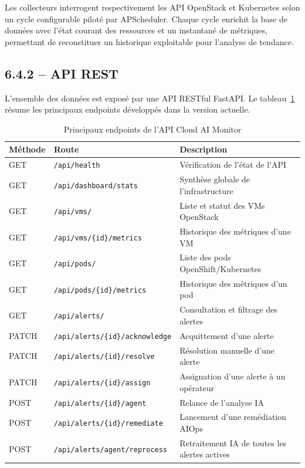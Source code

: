 \documentclass[11pt,a4paper]{report}
\begin{document}
Les collecteurs interrogent respectivement les API OpenStack et Kubernetes
selon un cycle configurable piloté par APScheduler. Chaque cycle enrichit la
base de données avec l'état courant des ressources et un instantané de
métriques, permettant de reconstituer un historique exploitable pour
l'analyse de tendance.

\subsection*{6.4.2 -- API REST}

L'ensemble des données est exposé par une API RESTful FastAPI. Le
tableau~\ref{tab:api} résume les principaux endpoints développés dans la
version actuelle.

\begin{table}[H]
\centering
\caption{Principaux endpoints de l'API Cloud AI Monitor}
\label{tab:api}
\begin{tabular}{|l|l|p{6cm}|}
\hline
\textbf{Méthode} & \textbf{Route} & \textbf{Description} \\
\hline
GET  & \texttt{/api/health}                  & Vérification de l'état de l'API \\
GET  & \texttt{/api/dashboard/stats}         & Synthèse globale de l'infrastructure \\
GET  & \texttt{/api/vms/}                    & Liste et statut des VMs OpenStack \\
GET  & \texttt{/api/vms/\{id\}/metrics}      & Historique des métriques d'une VM \\
GET  & \texttt{/api/pods/}                   & Liste des pods OpenShift/Kubernetes \\
GET  & \texttt{/api/pods/\{id\}/metrics}     & Historique des métriques d'un pod \\
GET  & \texttt{/api/alerts/}                 & Consultation et filtrage des alertes \\
PATCH & \texttt{/api/alerts/\{id\}/acknowledge} & Acquittement d'une alerte \\
PATCH & \texttt{/api/alerts/\{id\}/resolve} & Résolution manuelle d'une alerte \\
PATCH & \texttt{/api/alerts/\{id\}/assign}  & Assignation d'une alerte à un opérateur \\
POST & \texttt{/api/alerts/\{id\}/agent}    & Relance de l'analyse IA \\
POST & \texttt{/api/alerts/\{id\}/remediate} & Lancement d'une remédiation AIOps \\
POST & \texttt{/api/alerts/agent/reprocess} & Retraitement IA de toutes les alertes actives \\

\end{tabular}
\end{table}
\end{document}
